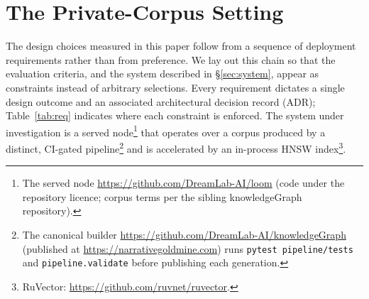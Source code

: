 \documentclass[10pt,twocolumn]{article}
\begin{document}
\section{The Private-Corpus Setting}\label{sec:setting}
The design choices measured in this paper follow from a sequence of deployment requirements rather than from preference. We lay out this chain so that the evaluation criteria, and the system described in \S\ref{sec:system}, appear as constraints instead of arbitrary selections. Every requirement dictates a single design outcome and an associated architectural decision record (ADR); Table~\ref{tab:req} indicates where each constraint is enforced. The system under investigation is a served node\footnote{The served node \url{https://github.com/DreamLab-AI/loom} (code under the repository licence; corpus terms per the sibling knowledgeGraph repository).} that operates over a corpus produced by a distinct, CI-gated pipeline\footnote{The canonical builder \url{https://github.com/DreamLab-AI/knowledgeGraph} (published at \url{https://narrativegoldmine.com}) runs \texttt{pytest pipeline/tests} and \texttt{pipeline.validate} before publishing each generation.} and is accelerated by an in-process HNSW index\footnote{RuVector: \url{https://github.com/ruvnet/ruvector}.}.
\end{document}
